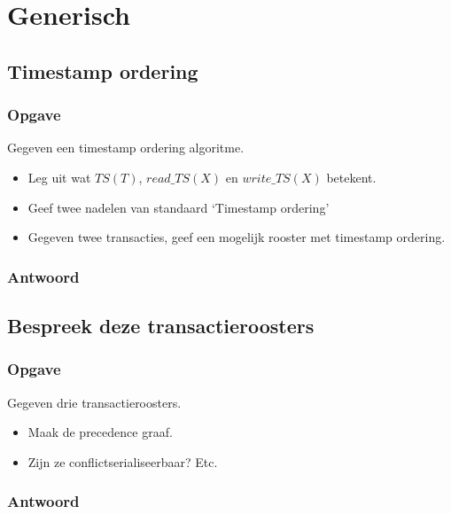 \documentclass[transacties.tex]{subfiles}
\begin{document}
\chapter{Generisch}
\renewcommand\thesection{V\arabic{section}}
\renewcommand\thesubsection{V\arabic{section}}


\section{Timestamp ordering}
\subsection*{Opgave}
Gegeven een timestamp ordering algoritme.
\begin{itemize}
\item Leg uit wat $TS(T)$, $read\_TS(X)$ en $write\_TS(X)$ betekent.
\item Geef twee nadelen van standaard `Timestamp ordering'
\item Gegeven twee transacties, geef een mogelijk rooster met timestamp ordering.
\end{itemize}
\subsection*{Antwoord}

\section{Bespreek deze transactieroosters}
\subsection*{Opgave}
Gegeven drie transactieroosters.
\begin{itemize}
\item Maak de precedence graaf.
\item Zijn ze conflictserialiseerbaar? Etc.
\end{itemize}
\subsection*{Antwoord}
\end{document}
